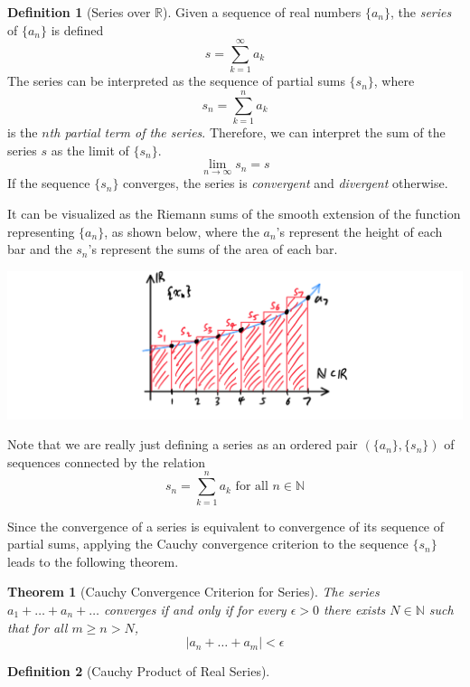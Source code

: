 \documentclass{article}
\newtheorem{theorem}{Theorem}[section]
\theoremstyle{remark}
\theoremstyle{definition}
\newtheorem{definition}{Definition}[section]
\begin{document}
\begin{definition}[Series over $\mathbb{R}$]
Given a sequence of real numbers $\{a_n\}$, the \textit{series} of $\{a_n\}$ is defined
\[s = \sum_{k=1}^\infty a_k\]
The series can be interpreted as the sequence of partial sums $\{s_n\}$, where
\[s_n = \sum_{k=1}^n a_k\]
is the \textit{$n$th partial term of the series}. Therefore, we can interpret the sum of the series $s$ as the limit of $\{s_n\}$. 
\[\lim_{n \rightarrow \infty} s_n = s\]
If the sequence $\{s_n\}$ converges, the series is \textit{convergent} and \textit{divergent} otherwise. 
\end{definition}

It can be visualized as the Riemann sums of the smooth extension of the function representing $\{a_n\}$, as shown below, where the $a_n$'s represent the height of each bar and the $s_n$'s represent the sums of the area of each bar. 
\begin{center}
    \includegraphics[scale=0.3]{img/Series_as_Riemann_Sums.PNG}
\end{center}
Note that we are really just defining a series as an ordered pair $(\{a_n\}, \{s_n\})$ of sequences connected by the relation 
\[s_n = \sum_{k=1}^n a_k \text{ for all } n \in \mathbb{N}\]

Since the convergence of a series is equivalent to convergence of its sequence of partial sums, applying the Cauchy convergence criterion to the sequence $\{s_n\}$ leads to the following theorem. 

\begin{theorem}[Cauchy Convergence Criterion for Series]
The series $a_1 + \ldots + a_n + \ldots$ converges if and only if for every $\epsilon > 0$ there exists $N \in \mathbb{N}$ such that for all $m \geq n > N$, 
\[|a_n + \ldots + a_m| < \epsilon\]
\end{theorem}

\begin{definition}[Cauchy Product of Real Series]

\end{definition}
\end{document}
